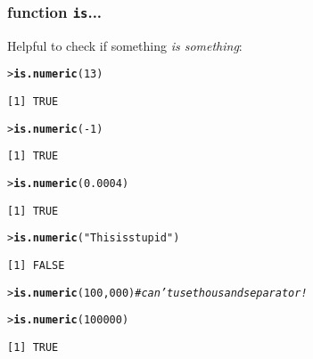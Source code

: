 \documentclass[13pt,aspectratio=169]{beamer}\usepackage[]{graphicx}\usepackage[]{color}
\makeatletter
\newcommand{\hlnum}[1]{\textcolor[rgb]{0.686,0.059,0.569}{#1}}%
\newcommand{\hlstr}[1]{\textcolor[rgb]{0.192,0.494,0.8}{#1}}%
\newcommand{\hlcom}[1]{\textcolor[rgb]{0.678,0.584,0.686}{\textit{#1}}}%
\newcommand{\hlopt}[1]{\textcolor[rgb]{0,0,0}{#1}}%
\newcommand{\hlstd}[1]{\textcolor[rgb]{0.345,0.345,0.345}{#1}}%
\newcommand{\hlkwd}[1]{\textcolor[rgb]{0.737,0.353,0.396}{\textbf{#1}}}%
\newenvironment{kframe}{%
 \def\at@end@of@kframe{}%
 \ifinner\ifhmode%
  \def\at@end@of@kframe{\end{minipage}}%
  \begin{minipage}{\columnwidth}%
 \fi\fi%
 \def\FrameCommand##1{\hskip\@totalleftmargin \hskip-\fboxsep
 \colorbox{shadecolor}{##1}\hskip-\fboxsep
     \hskip-\linewidth \hskip-\@totalleftmargin \hskip\columnwidth}%
 \MakeFramed {\advance\hsize-\width
   \@totalleftmargin\z@ \linewidth\hsize
   \@setminipage}}%
 {\par\unskip\endMakeFramed%
 \at@end@of@kframe}
\newenvironment{knitrout}{}{} %
\renewcommand{\tt}[1]{\texttt{#1}}
\renewenvironment{knitrout}{\setlength{\topsep}{0mm}}{}
\makeatother
\begin{document}
\begin{frame}[fragile]
    \frametitle{function \tt{is}...}
    Helpful to check if something \alert{\textit{is something}}:\\
\begin{knitrout}\small
{}\color{fgcolor}\begin{kframe}
\begin{alltt}
\hlstd{> }\hlkwd{is.numeric}\hlstd{(}\hlnum{13}\hlstd{)}
\end{alltt}
\begin{verbatim}
[1] TRUE
\end{verbatim}
\begin{alltt}
\hlstd{> }\hlkwd{is.numeric}\hlstd{(}\hlopt{-}\hlnum{1}\hlstd{)}
\end{alltt}
\begin{verbatim}
[1] TRUE
\end{verbatim}
\begin{alltt}
\hlstd{> }\hlkwd{is.numeric}\hlstd{(}\hlnum{0.0004}\hlstd{)}
\end{alltt}
\begin{verbatim}
[1] TRUE
\end{verbatim}
\begin{alltt}
\hlstd{> }\hlkwd{is.numeric}\hlstd{(}\hlstr{"This is stupid"}\hlstd{)}
\end{alltt}
\begin{verbatim}
[1] FALSE
\end{verbatim}
\begin{alltt}
\hlstd{> }\hlkwd{is.numeric}\hlstd{(}\hlnum{100}\hlstd{,}\hlnum{000}\hlstd{)} \hlcom{# can't use thousand separator!}
\end{alltt}


{\ttfamily\noindent\bfseries\color{errorcolor}{Error in is.numeric(100, 0): 2 arguments passed to 'is.numeric' which requires 1}}\begin{alltt}
\hlstd{> }\hlkwd{is.numeric}\hlstd{(}\hlnum{100000}\hlstd{)}
\end{alltt}
\begin{verbatim}
[1] TRUE
\end{verbatim}
\end{kframe}
\end{knitrout}
\end{frame}
\end{document}
